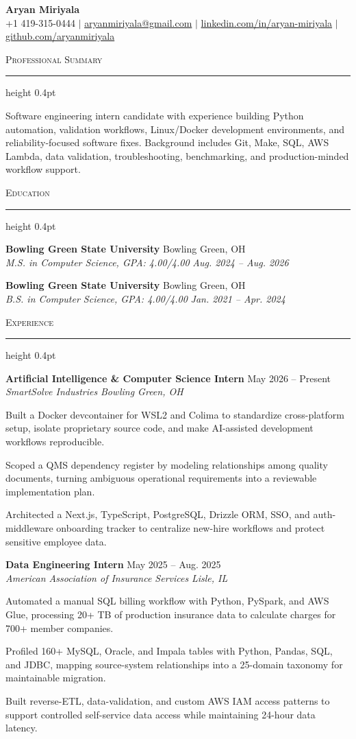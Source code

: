 \documentclass[letterpaper,11pt]{article}
\newcommand{\resumesection}[1]{%
  \par\vspace{2pt}%
  {\large\scshape #1}\par\vspace{2pt}%
  \hrule height 0.4pt\vspace{2pt}%
}
\newcommand{\resumeSubheading}[4]{
  \textbf{#1} \hfill #2\\
  \textit{#3} \hfill \textit{#4}
}
\begin{document}
\begin{center}
  {\LARGE \textbf{Aryan Miriyala}}\\[-1pt]
  \small
  +1 419-315-0444 $|$
  \href{mailto:aryanmiriyala@gmail.com}{aryanmiriyala@gmail.com} $|$
  \href{https://www.linkedin.com/in/aryan-miriyala-7788a21b6/}{linkedin.com/in/aryan-miriyala} $|$
  \href{https://github.com/aryanmiriyala}{github.com/aryanmiriyala}
\end{center}\vspace{-10pt}

\resumesection{Professional Summary}
Software engineering intern candidate with experience building Python automation, validation workflows, Linux/Docker development environments, and reliability-focused software fixes. Background includes Git, Make, SQL, AWS Lambda, data validation, troubleshooting, benchmarking, and production-minded workflow support.

\resumesection{Education}
\resumeSubheading
{Bowling Green State University}{Bowling Green, OH}
{M.S. in Computer Science, GPA: 4.00/4.00}{Aug. 2024 -- Aug. 2026}

\resumeSubheading
{Bowling Green State University}{Bowling Green, OH}
{B.S. in Computer Science, GPA: 4.00/4.00}{Jan. 2021 -- Apr. 2024}

\resumesection{Experience}
\resumeSubheading
{Artificial Intelligence \& Computer Science Intern}{May 2026 -- Present}
{SmartSolve Industries}{Bowling Green, OH}
\begin{tightitemize}
  \item Built a Docker devcontainer for WSL2 and Colima to standardize cross-platform setup, isolate proprietary source code, and make AI-assisted development workflows reproducible.
  \item Scoped a QMS dependency register by modeling relationships among quality documents, turning ambiguous operational requirements into a reviewable implementation plan.
  \item Architected a Next.js, TypeScript, PostgreSQL, Drizzle ORM, SSO, and auth-middleware onboarding tracker to centralize new-hire workflows and protect sensitive employee data.
\end{tightitemize}

\resumeSubheading
{Data Engineering Intern}{May 2025 -- Aug. 2025}
{American Association of Insurance Services}{Lisle, IL}
\begin{tightitemize}
  \item Automated a manual SQL billing workflow with Python, PySpark, and AWS Glue, processing 20+ TB of production insurance data to calculate charges for 700+ member companies.
  \item Profiled 160+ MySQL, Oracle, and Impala tables with Python, Pandas, SQL, and JDBC, mapping source-system relationships into a 25-domain taxonomy for maintainable migration.
  \item Built reverse-ETL, data-validation, and custom AWS IAM access patterns to support controlled self-service data access while maintaining 24-hour data latency.
\end{tightitemize}
\end{document}
